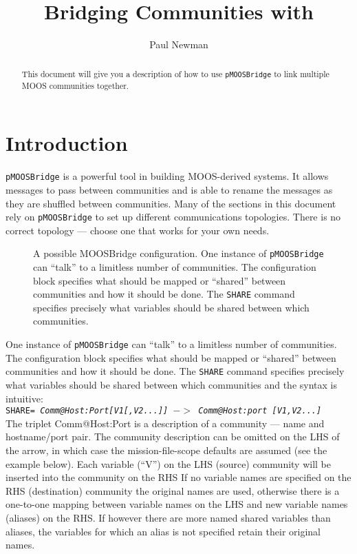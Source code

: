 \documentclass[a4paper,10pt]{article}
\title{Bridging Communities with \code{pMOOSBridge}}
\author{Paul Newman}
\newcommand{\Code}[1]{\texttt{#1} }
\newcommand{\code}[1]{\Code{#1} }
\begin{document}
\maketitle

\begin{center}
\end{center}
\begin{abstract}
This document will give you a description of how to use \code{pMOOSBridge} to link multiple MOOS communities together.
\end{abstract}

\section{Introduction}

\code{pMOOSBridge} is a powerful tool in building MOOS-derived
systems. It allows messages to pass between communities and is
able to rename the messages as they are shuffled between
communities. Many of the sections in this document rely on
\code{pMOOSBridge} to set up different communications topologies. There is no correct topology --- choose one that
works for your own needs.
\begin{figure}[ht]
\centering {}
\caption{A possible MOOSBridge
configuration. One instance of \code{pMOOSBridge} can ``talk'' to a limitless
number of communities. The configuration block specifies what
should be mapped or ``shared'' between communities and how it
should be done. The \code{SHARE} command specifies precisely what
variables should be shared between which communities.}\label{fig:MOOSBridge1}
\end{figure}
One instance of \code{pMOOSBridge} can ``talk'' to a limitless
number of communities. The configuration block specifies what
should be mapped or ``shared'' between communities and how it
should be done. The \code{SHARE} command specifies precisely what
variables should be shared between which communities and the
syntax is intuitive:\\

\code{SHARE= {\it{Comm@Host:Port[V1[,V2...]] $->$ Comm@Host:port
[V1,V2...]}}}\\

The triplet Comm@Host:Port is a description of a community ---  name and hostname/port pair. The community
description can be omitted on the LHS of the arrow, in which case the mission-file-scope defaults are assumed (see the example below).
Each variable (``V'') on the LHS (source) community will be inserted into the community on the RHS
If no variable names are specified on the RHS (destination) community the original names are used, otherwise
there is a one-to-one mapping between variable names on the LHS and new variable names (aliases) on the RHS. If however
there are more named shared variables than aliases, the variables for which an alias is not specified retain their original names.
\end{document}
